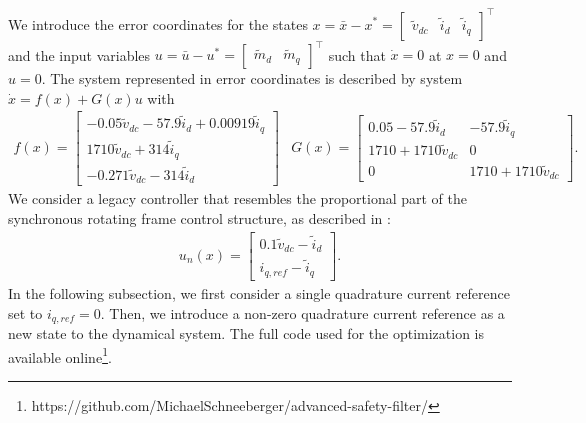 \documentclass[lettersize,journal]{IEEEtran}
\begin{document}
We introduce the error coordinates for the states $x = \bar x - x^* = [\begin{matrix}\tilde v_{dc} & \tilde i_d & \tilde i_q\end{matrix}]^\top$ and the input variables $u = \bar u - u^* = [\begin{matrix}\tilde m_d & \tilde m_q\end{matrix}]^\top$ such that $\dot x = 0$ at $x=0$ and $u=0$.
The system represented in error coordinates is described by system $\dot x = f(x) + G(x) u$ with
\begin{subequations}
   \begin{align*}
      f(x) = \begin{bmatrix}
         -0.05 \tilde v_{dc} - 57.9 \tilde i_d + 0.00919 \tilde i_q \\
         1710 \tilde v_{dc} + 314 \tilde i_q \\
         -0.271 \tilde v_{dc} - 314 \tilde i_d
      \end{bmatrix}
   \end{align*}
   \begin{align*}
      G(x) = \begin{bmatrix}
         0.05 - 57.9 \tilde i_d & -57.9 \tilde i_q \\
         1710 + 1710 \tilde v_{dc} & 0 \\
         0 & 1710 + 1710 \tilde v_{dc}
      \end{bmatrix}.
   \end{align*}
\end{subequations}
We consider a legacy controller that resembles the proportional part of the synchronous rotating frame control structure, as described in \cite{blaabjerg2006overview}:
\begin{align*}
   u_n(x) = \begin{bmatrix}
      0.1 \tilde v_{dc} - \tilde i_d \\
      i_{q,ref} - \tilde i_q
   \end{bmatrix}.
\end{align*}
In the following subsection, we first consider a single quadrature current reference set to $i_{q,ref} = 0$.
Then, we introduce a non-zero quadrature current reference as a new state to the dynamical system.
The full code used for the optimization is available online\footnote{https://github.com/MichaelSchneeberger/advanced-safety-filter/}.
\end{document}
